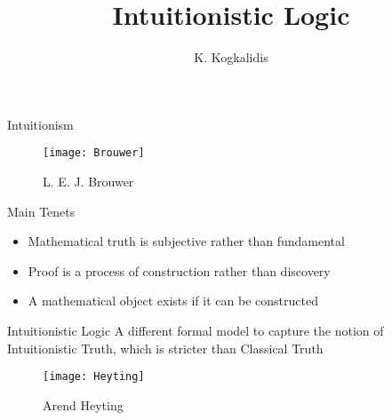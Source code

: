 \documentclass{beamer}
\title{Intuitionistic Logic}
\author{K. Kogkalidis}
\institute{Logic \& Language 2020}
\begin{document}
\date{}
\maketitle

\begin{frame}{Intuitionism}

\begin{minipage}[t]{0.3\textwidth}
	\begin{figure}
	\texttt{[image: Brouwer]}
	\caption{L. E. J. Brouwer}
	\end{figure}
\end{minipage}%
\begin{minipage}[t]{0.7\textwidth}
	\begin{block}{Main Tenets}
	\begin{itemize}
		\item Mathematical truth is subjective rather than fundamental
		\item Proof is a process of construction rather than discovery
		\item A mathematical object exists if it can be constructed
	\end{itemize}
	\end{block}
\end{minipage}
\vfill


\begin{minipage}[t]{0.7\textwidth}
	\begin{block}{Intuitionistic Logic}
		A different formal model to capture the notion of Intuitionistic Truth, which is stricter
		than Classical Truth
	\end{block}
\end{minipage}%
\begin{minipage}[t]{0.3\textwidth}
\begin{figure}
\texttt{[image: Heyting]}
\caption{Arend Heyting}
\end{figure}
\end{minipage}
\end{frame}
\end{document}
